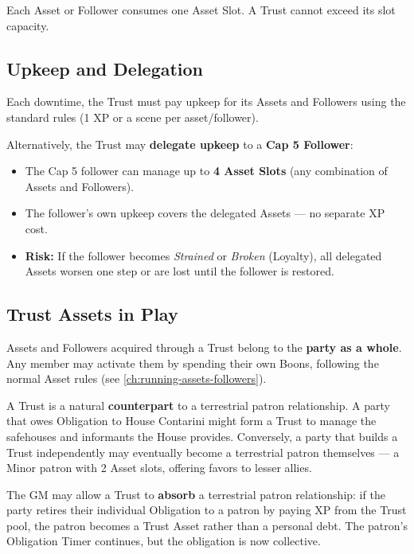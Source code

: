\noindent Each Asset or Follower consumes one Asset Slot. A Trust cannot exceed its slot capacity.

\subsection{Upkeep and Delegation}

Each downtime, the Trust must pay upkeep for its Assets and Followers using the standard rules (1 XP or a scene per asset/follower). 

Alternatively, the Trust may \textbf{delegate upkeep} to a \textbf{Cap 5 Follower}:
\begin{itemize}
  \item The Cap 5 follower can manage up to \textbf{4 Asset Slots} (any combination of Assets and Followers).
  \item The follower's own upkeep covers the delegated Assets --- no separate XP cost.
  \item \textbf{Risk:} If the follower becomes \textit{Strained} or \textit{Broken} (Loyalty), all delegated Assets worsen one step or are lost until the follower is restored.
\end{itemize}

\subsection{Trust Assets in Play}

Assets and Followers acquired through a Trust belong to the \textbf{party as a whole}. Any member may activate them by spending their own Boons, following the normal Asset rules (see \ref{ch:running-assets-followers}).

\begin{tcolorbox}[colback=blue!5!white,colframe=blue!75!black,title=Trusts and Terrestrial Patrons,breakable]
A Trust is a natural \textbf{counterpart} to a terrestrial patron relationship. A party that owes Obligation to House Contarini might form a Trust to manage the safehouses and informants the House provides. Conversely, a party that builds a Trust independently may eventually become a terrestrial patron themselves --- a Minor patron with 2 Asset slots, offering favors to lesser allies.

The GM may allow a Trust to \textbf{absorb} a terrestrial patron relationship: if the party retires their individual Obligation to a patron by paying XP from the Trust pool, the patron becomes a Trust Asset rather than a personal debt. The patron's Obligation Timer continues, but the obligation is now collective.
\end{tcolorbox}

